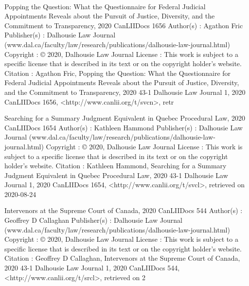 \bigskip
\hfill{}\hfill\ %
\bigskip
%
\printbibliography[
	heading=subbibliography,%
	nottype=case,
	nottype=statute,
	nottype=ljarticle,
	notkeyword=lawbook,
	title={\center General Material},
		]

\printindex[general]





Popping the Question: What the Questionnaire for Federal Judicial Appointments Reveals about the Pursuit of Justice, Diversity, and the Commitment to Transparency, 2020 CanLIIDocs 1656
Author(s) : 	Agathon Fric
Publisher(s) : 	Dalhousie Law Journal (www.dal.ca/faculty/law/research/publications/dalhousie-law-journal.html)
Copyright : 	© 2020, Dalhousie Law Journal
License : 	This work is subject to a specific license that is described in its text or on the copyright holder's website.
Citation : 	Agathon Fric, Popping the Question: What the Questionnaire for Federal Judicial Appointments Reveals about the Pursuit of Justice, Diversity, and the Commitment to Transparency, 2020 43-1 Dalhousie Law Journal 1, 2020 CanLIIDocs 1656, <http://www.canlii.org/t/svcn>, retr



Searching for a Summary Judgment Equivalent in Quebec Procedural Law, 2020 CanLIIDocs 1654
Author(s) : 	Kathleen Hammond
Publisher(s) : 	Dalhousie Law Journal (www.dal.ca/faculty/law/research/publications/dalhousie-law-journal.html)
Copyright : 	© 2020, Dalhousie Law Journal
License : 	This work is subject to a specific license that is described in its text or on the copyright holder's website.
Citation : 	Kathleen Hammond, Searching for a Summary Judgment Equivalent in Quebec Procedural Law, 2020 43-1 Dalhousie Law Journal 1, 2020 CanLIIDocs 1654, <http://www.canlii.org/t/svcl>, retrieved on 2020-08-24




Intervenors at the Supreme Court of Canada, 2020 CanLIIDocs 544
Author(s) : 	Geoffrey D Callaghan
Publisher(s) : 	Dalhousie Law Journal (www.dal.ca/faculty/law/research/publications/dalhousie-law-journal.html)
Copyright : 	© 2020, Dalhousie Law Journal
License : 	This work is subject to a specific license that is described in its text or on the copyright holder's website.
Citation : 	Geoffrey D Callaghan, Intervenors at the Supreme Court of Canada, 2020 43-1 Dalhousie Law Journal 1, 2020 CanLIIDocs 544, <http://www.canlii.org/t/srcl>, retrieved on 2



